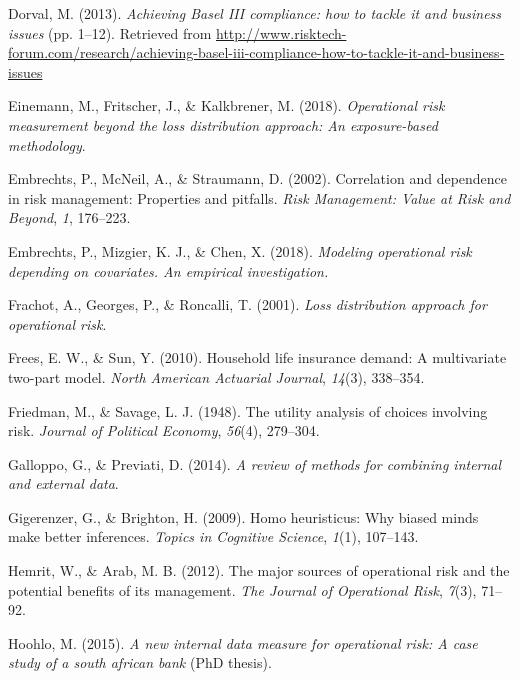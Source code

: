 \documentclass{DissertateUSU}
\begin{document}
\leavevmode\hypertarget{ref-mysis2013}{}%
Dorval, M. (2013). \emph{Achieving Basel III compliance: how to tackle
it and business issues} (pp. 1--12). Retrieved from
\url{http://www.risktech-forum.com/research/achieving-basel-iii-compliance-how-to-tackle-it-and-business-issues}

\leavevmode\hypertarget{ref-einemann2018operational}{}%
Einemann, M., Fritscher, J., \& Kalkbrener, M. (2018). \emph{Operational
risk measurement beyond the loss distribution approach: An
exposure-based methodology}.

\leavevmode\hypertarget{ref-embrechts2002correlation}{}%
Embrechts, P., McNeil, A., \& Straumann, D. (2002). Correlation and
dependence in risk management: Properties and pitfalls. \emph{Risk
Management: Value at Risk and Beyond}, \emph{1}, 176--223.

\leavevmode\hypertarget{ref-embrechts2018modeling}{}%
Embrechts, P., Mizgier, K. J., \& Chen, X. (2018). \emph{Modeling
operational risk depending on covariates. An empirical investigation.}

\leavevmode\hypertarget{ref-frachot2001loss}{}%
Frachot, A., Georges, P., \& Roncalli, T. (2001). \emph{Loss
distribution approach for operational risk}.

\leavevmode\hypertarget{ref-frees2010household}{}%
Frees, E. W., \& Sun, Y. (2010). Household life insurance demand: A
multivariate two-part model. \emph{North American Actuarial Journal},
\emph{14}(3), 338--354.

\leavevmode\hypertarget{ref-friedman1948utility}{}%
Friedman, M., \& Savage, L. J. (1948). The utility analysis of choices
involving risk. \emph{Journal of Political Economy}, \emph{56}(4),
279--304.

\leavevmode\hypertarget{ref-galloppo2014review}{}%
Galloppo, G., \& Previati, D. (2014). \emph{A review of methods for
combining internal and external data}.

\leavevmode\hypertarget{ref-gigerenzer2009homo}{}%
Gigerenzer, G., \& Brighton, H. (2009). Homo heuristicus: Why biased
minds make better inferences. \emph{Topics in Cognitive Science},
\emph{1}(1), 107--143.

\leavevmode\hypertarget{ref-hemrit2012major}{}%
Hemrit, W., \& Arab, M. B. (2012). The major sources of operational risk
and the potential benefits of its management. \emph{The Journal of
Operational Risk}, \emph{7}(3), 71--92.

\leavevmode\hypertarget{ref-hoohlo2015new}{}%
Hoohlo, M. (2015). \emph{A new internal data measure for operational
risk: A case study of a south african bank} (PhD thesis).
\end{document}
